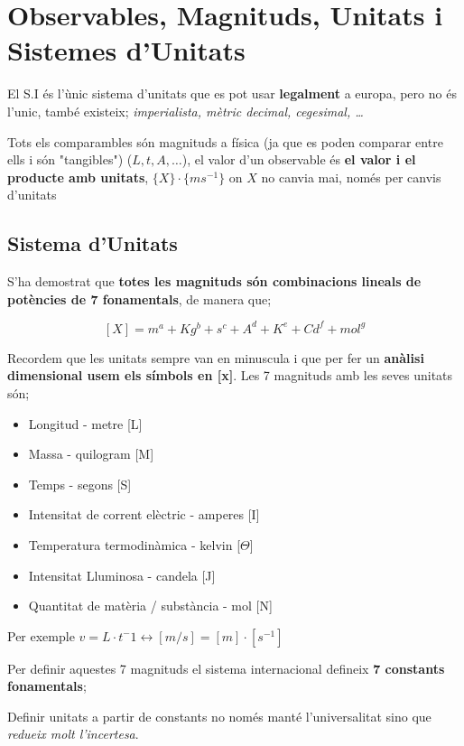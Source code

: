 \documentclass[12pt]{article}
\begin{document}
\section{Observables, Magnituds, Unitats i Sistemes d'Unitats}

El S.I és l'ùnic sistema d'unitats que es pot usar \textbf{legalment} a europa, pero no és l'unic, també existeix; \textit{imperialista, mètric decimal, cegesimal, \dots}

Tots els comparambles són magnituds a física (ja que es poden comparar entre ells i són "tangibles") ($L, t, A, \dots$), el valor d'un observable és \textbf{el valor i el producte amb unitats}, $\{X\}\cdot\{ms^{-1}\}$ on $X$ no canvia mai, només per canvis d'unitats

\subsection{Sistema d'Unitats}

S'ha demostrat que \textbf{totes les magnituds són combinacions lineals de potències de 7 fonamentals}, de manera que;

\[[X] = m^a + Kg^b + s^c + A^d+K^e + Cd^f + mol^g\]

Recordem que les unitats sempre van en minuscula i que per fer un \textbf{anàlisi dimensional usem els símbols en [x]}. Les 7 magnituds amb les seves unitats són;

\begin{itemize}
    \item Longitud - metre [L]
    \item Massa - quilogram [M]
    \item Temps - segons [S]
    \item Intensitat de corrent elèctric - amperes [I]
    \item Temperatura termodinàmica - kelvin [$\Theta$]
    \item Intensitat Lluminosa - candela [J]
    \item Quantitat de matèria / substància - mol [N]
\end{itemize}

Per exemple $v = L \cdot t^-1 \leftrightarrow [m/s] = [m]\cdot[s^{-1}]$ 

Per definir aquestes 7 magnituds el sistema internacional defineix \textbf{7 constants fonamentals};


Definir unitats a partir de constants no només manté l'universalitat sino que \textit{redueix molt l'incertesa}.
\end{document}
